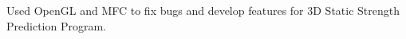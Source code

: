 \begin{miniItemize}
    \item 
    Used OpenGL and MFC to fix bugs and develop features for 3D Static Strength Prediction Program.
\end{miniItemize}